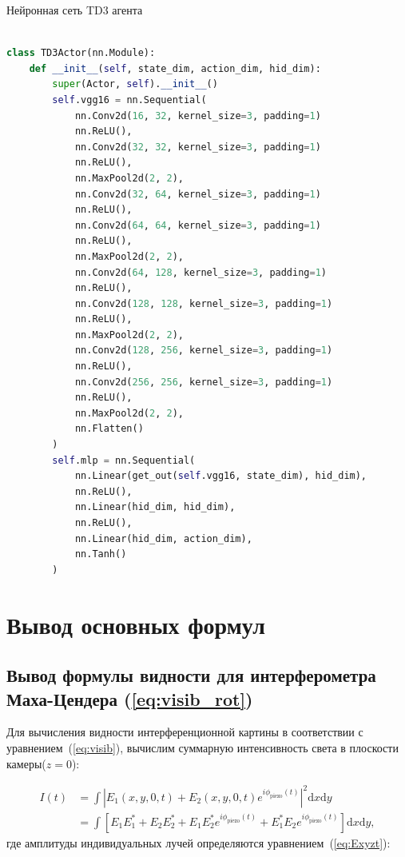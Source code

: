 \begin{ListingEnv}[!h]
\captiondelim{ }
\caption{Нейронная сеть TD3 агента}\label{lst:td3}

\begin{lstlisting}[language=Python]

class TD3Actor(nn.Module):
    def __init__(self, state_dim, action_dim, hid_dim):
        super(Actor, self).__init__()
        self.vgg16 = nn.Sequential(
            nn.Conv2d(16, 32, kernel_size=3, padding=1)
            nn.ReLU(),
            nn.Conv2d(32, 32, kernel_size=3, padding=1)
            nn.ReLU(),
            nn.MaxPool2d(2, 2), 
            nn.Conv2d(32, 64, kernel_size=3, padding=1)
            nn.ReLU(),
            nn.Conv2d(64, 64, kernel_size=3, padding=1)
            nn.ReLU(),
            nn.MaxPool2d(2, 2), 
            nn.Conv2d(64, 128, kernel_size=3, padding=1)
            nn.ReLU(),
            nn.Conv2d(128, 128, kernel_size=3, padding=1)
            nn.ReLU(),
            nn.MaxPool2d(2, 2), 
            nn.Conv2d(128, 256, kernel_size=3, padding=1)
            nn.ReLU(),
            nn.Conv2d(256, 256, kernel_size=3, padding=1)
            nn.ReLU(),
            nn.MaxPool2d(2, 2),
            nn.Flatten()
        )
        self.mlp = nn.Sequential(
            nn.Linear(get_out(self.vgg16, state_dim), hid_dim),
            nn.ReLU(),
            nn.Linear(hid_dim, hid_dim),
            nn.ReLU(),
            nn.Linear(hid_dim, action_dim),
            nn.Tanh()
        )
\end{lstlisting}
\end{ListingEnv}    


\chapter{Вывод основных формул}\label{app:B}

\section{Вывод формулы видности для интерферометра Маха-Цендера (\ref{eq:visib_rot})}\label{app:B1}

Для вычисления видности интерференционной картины в соответствии с уравнением~(\ref{eq:visib}), вычислим суммарную интенсивность света в плоскости камеры($z=0$):

\begin{align}
    I(t)&=\int |E_1(x,y,0,t)+E_2(x,y,0,t)e^{i\phi_{\mathrm{piezo}}(t)}|^2 {\mathrm{d}}x{\mathrm{d}}y \nonumber \\
    &= \int \left[E_1 E_1 ^* + E_2 E_2^* + E_1 E_2^*e^{i\phi_{\mathrm{piezo}}(t)} + E_1^*E_2e^{i\phi_{\mathrm{piezo}}(t)}\right]{\mathrm{ d}}x{\mathrm{d}}y ,\label{eq:itot}
\end{align}
где амплитуды индивидуальных лучей определяются уравнением~(\ref{eq:Exyzt}):

